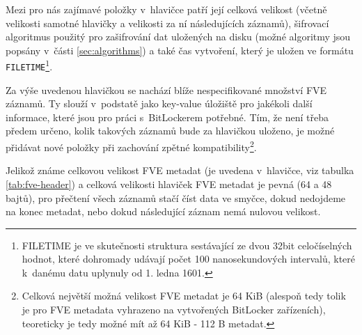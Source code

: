 
Mezi pro nás zajímavé položky v~hlavičce patří její celková velikost (včetně velikosti samotné hlavičky a velikosti za ní následujících záznamů), šifrovací algoritmus použitý pro zašifrování dat uložených na disku (možné algoritmy jsou popsány v~části \ref{sec:algorithms}) a také čas vytvoření, který je uložen ve formátu \texttt{FILETIME}\footnote{FILETIME je ve skutečnosti struktura sestávající ze dvou 32bit celočíselných hodnot, které dohromady udávají počet 100 nanosekundových intervalů, které k~danému datu uplynuly od 1. ledna 1601.\cite{Zxwr6wjYZUQ6z8Yp}}.

\label{sec:fve-metadata-entry}

Za výše uvedenou hlavičkou se nachází blíže nespecifikované množství FVE záznamů. Ty slouží v~podstatě jako key-value úložiště pro jakékoli další informace, které jsou pro práci s~BitLockerem potřebné. Tím, že není třeba předem určeno, kolik takových záznamů bude za hlavičkou uloženo, je možné přidávat nové položky při zachování zpětné kompatibility\footnote{Celková největší možná velikost FVE metadat je 64 KiB (alespoň tedy tolik je pro FVE metadata vyhrazeno na vytvořených BitLocker zařízeních), teoreticky je tedy možné mít až 64 KiB - 112 B metadat.}.

Jelikož známe celkovou velikost FVE metadat (je uvedena v~hlavičce, viz tabulka \ref{tab:fve-header}) a celková velikosti hlaviček FVE metadat je pevná (64 a 48 bajtů), pro přečtení všech záznamů stačí číst data ve smyčce, dokud nedojdeme na konec metadat, nebo dokud následující záznam nemá nulovou velikost.

